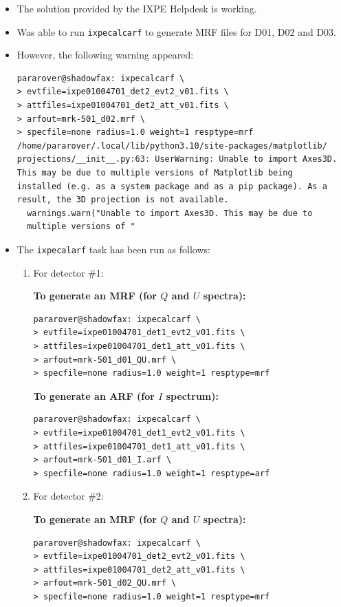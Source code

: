  \label{entry:20251016}
    \begin{itemize}
        \item The solution provided by the IXPE Helpdesk is working.

        \item Was able to run \verb|ixpecalcarf| to generate MRF files for D01, D02 and D03.

        \item However, the following warning appeared:
        \begin{verbatim}
pararover@shadowfax: ixpecalcarf \
> evtfile=ixpe01004701_det2_evt2_v01.fits \
> attfiles=ixpe01004701_det2_att_v01.fits \
> arfout=mrk-501_d02.mrf \
> specfile=none radius=1.0 weight=1 resptype=mrf
/home/pararover/.local/lib/python3.10/site-packages/matplotlib/
projections/__init__.py:63: UserWarning: Unable to import Axes3D.
This may be due to multiple versions of Matplotlib being
installed (e.g. as a system package and as a pip package). As a
result, the 3D projection is not available.
  warnings.warn("Unable to import Axes3D. This may be due to
  multiple versions of "
        \end{verbatim}

        \item The \verb|ixpecalarf| task has been run as follows:
        \begin{enumerate}
            \item For detector \#1:

            \textbf{To generate an MRF (for $Q$ and $U$ spectra):}
            \begin{verbatim}
pararover@shadowfax: ixpecalcarf \
> evtfile=ixpe01004701_det1_evt2_v01.fits \
> attfiles=ixpe01004701_det1_att_v01.fits \
> arfout=mrk-501_d01_QU.mrf \
> specfile=none radius=1.0 weight=1 resptype=mrf
            \end{verbatim}

            \textbf{To generate an ARF (for $I$ spectrum):}
            \begin{verbatim}
pararover@shadowfax: ixpecalcarf \
> evtfile=ixpe01004701_det1_evt2_v01.fits \
> attfiles=ixpe01004701_det1_att_v01.fits \
> arfout=mrk-501_d01_I.arf \
> specfile=none radius=1.0 weight=1 resptype=arf
            \end{verbatim}

            \item For detector \#2:

            \textbf{To generate an MRF (for $Q$ and $U$ spectra):}
            \begin{verbatim}
pararover@shadowfax: ixpecalcarf \
> evtfile=ixpe01004701_det2_evt2_v01.fits \
> attfiles=ixpe01004701_det2_att_v01.fits \
> arfout=mrk-501_d02_QU.mrf \
> specfile=none radius=1.0 weight=1 resptype=mrf
            \end{verbatim}


\end{enumerate}
\end{itemize}

